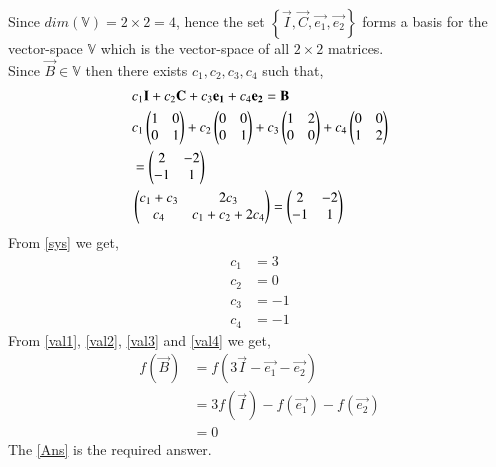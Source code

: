 \documentclass[journal,12pt,twocolumn]{IEEEtran}
\begin{document}
Since $dim(\mathbb{V}) = 2\times2 = 4$, hence the set $\left\{\vec{I},\vec{C},\vec{e_1}, \vec{e_2}\right\}$ forms a basis for the vector-space $\mathbb{V}$ which is the vector-space of all $2 \times 2$ matrices.\\
Since $\vec{B} \in \mathbb{V}$ then there exists $c_1,c_2,c_3,c_4$ such that,
\begin{align}
&c_1\mathbf{I}+c_2\mathbf{C}+c_3\mathbf{e_1}+c_4\mathbf{e_2} =\mathbf{B}\\
&c_1\begin{pmatrix}1&0\\0&1\end{pmatrix}+c_2\begin{pmatrix}0&0\\0&1\end{pmatrix}+c_3\begin{pmatrix}1&2\\0&0\end{pmatrix}+c_4\begin{pmatrix}0&0\\1&2\end{pmatrix}\\
&=\begin{pmatrix}2&-2\\-1&1\end{pmatrix}\\
&\begin{pmatrix}c_1+c_3&2c_3\\c_4&c_1+c_2+2c_4\end{pmatrix} = \begin{pmatrix}2&-2\\-1&1\end{pmatrix}\label{sys}\\
\end{align}
From \eqref{sys} we get,
\begin{align}
c_1 &= 3\label{val1}\\
c_2 &= 0\label{val2}\\
c_3 &= -1\label{val3}\\
c_4 &= -1\label{val4}
\end{align}
From \eqref{val1}, \eqref{val2}, \eqref{val3} and \eqref{val4} we get,
\begin{align}
f(\vec{B}) &= f(3\vec{I}-\vec{e_1}-\vec{e_2})\\
&= 3f(\vec{I})-f(\vec{e_1})-f(\vec{e_2})\\
&= 0\label{Ans}
\end{align}
The \eqref{Ans} is the required answer.
\end{document}
